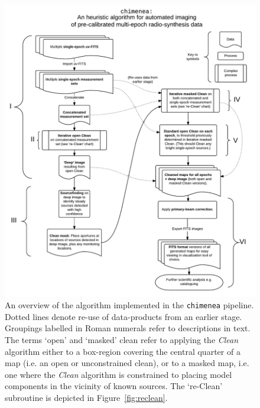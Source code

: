 \documentclass[5p,authoryear]{elsarticle}
\begin{document}
\begin{figure}[p!]
\begin{center}  
  \includegraphics[width=.96\textwidth]{../figures/chimenea-flow-bold-labels}
  \caption[Overview of \texttt{chimenea} logic]{%
An overview of the algorithm implemented in the \texttt{chimenea} pipeline.
Dotted lines denote re-use of data-products from an earlier stage. 
Groupings labelled in Roman numerals refer to descriptions in text.
The terms `open' and `masked' clean refer to applying the \textit{Clean}
algorithm \citep{Schwab1984} either to a box-region covering the central quarter of a map (i.e. an open or unconstrained clean), or to a masked map, i.e. one where the \textit{Clean} algorithm is constrained to placing model components in the vicinity of known sources.
The `re-Clean' subroutine is depicted in Figure~\ref{fig:reclean}.
\label{fig:chimenea}
} 
\end{center} 
\end{figure}
\end{document}
